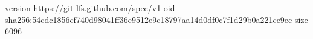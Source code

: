 version https://git-lfs.github.com/spec/v1
oid sha256:54cdc1856cf740d98041ff36e9512e9c18797aa14d0df0c7f1d29b0a221ce9ec
size 6096
